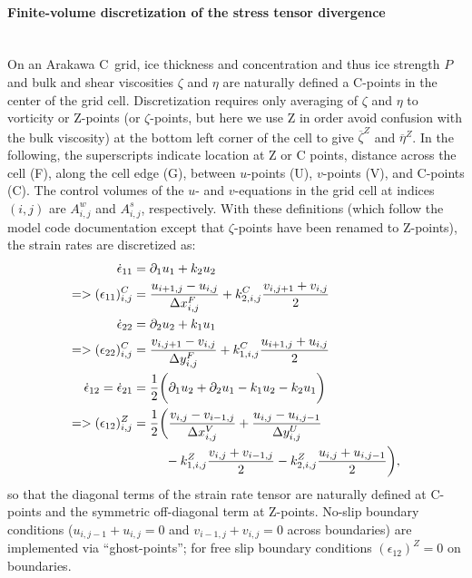 \paragraph{Finite-volume discretization of the stress tensor
  divergence\label{sec:pkg:seaice:discretization}}~\\
%
On an Arakawa C~grid, ice thickness and concentration and thus ice
strength $P$ and bulk and shear viscosities $\zeta$ and $\eta$ are
naturally defined a C-points in the center of the grid
cell. Discretization requires only averaging of $\zeta$ and $\eta$ to
vorticity or Z-points (or $\zeta$-points, but here we use Z in order
avoid confusion with the bulk viscosity) at the bottom left corner of
the cell to give $\overline{\zeta}^{Z}$ and $\overline{\eta}^{Z}$. In
the following, the superscripts indicate location at Z or C points,
distance across the cell (F), along the cell edge (G), between
$u$-points (U), $v$-points (V), and C-points (C). The control volumes
of the $u$- and $v$-equations in the grid cell at indices $(i,j)$ are
$A_{i,j}^{w}$ and $A_{i,j}^{s}$, respectively. With these definitions
(which follow the model code documentation except that $\zeta$-points
have been renamed to Z-points), the strain rates are discretized as:
\begin{align}
  \dot{\epsilon}_{11} &= \partial_{1}{u}_{1} + k_{2}u_{2} \\ \notag
  => (\epsilon_{11})_{i,j}^C &= \frac{u_{i+1,j}-u_{i,j}}{\Delta{x}_{i,j}^{F}} 
   + k_{2,i,j}^{C}\frac{v_{i,j+1}+v_{i,j}}{2} \\ 
  \dot{\epsilon}_{22} &= \partial_{2}{u}_{2} + k_{1}u_{1} \\\notag
  => (\epsilon_{22})_{i,j}^C &= \frac{v_{i,j+1}-v_{i,j}}{\Delta{y}_{i,j}^{F}} 
   + k_{1,i,j}^{C}\frac{u_{i+1,j}+u_{i,j}}{2} \\ 
   \dot{\epsilon}_{12} = \dot{\epsilon}_{21} &= \frac{1}{2}\biggl(
   \partial_{1}{u}_{2} + \partial_{2}{u}_{1} - k_{1}u_{2} - k_{2}u_{1}
   \biggr) \\ \notag
  => (\epsilon_{12})_{i,j}^Z &= \frac{1}{2}
  \biggl( \frac{v_{i,j}-v_{i-1,j}}{\Delta{x}_{i,j}^V} 
   + \frac{u_{i,j}-u_{i,j-1}}{\Delta{y}_{i,j}^U} \\\notag
  &\phantom{=\frac{1}{2}\biggl(}
   - k_{1,i,j}^{Z}\frac{v_{i,j}+v_{i-1,j}}{2}
   - k_{2,i,j}^{Z}\frac{u_{i,j}+u_{i,j-1}}{2}
   \biggr),
\end{align}
so that the diagonal terms of the strain rate tensor are naturally
defined at C-points and the symmetric off-diagonal term at
Z-points. No-slip boundary conditions ($u_{i,j-1}+u_{i,j}=0$ and
$v_{i-1,j}+v_{i,j}=0$ across boundaries) are implemented via
``ghost-points''; for free slip boundary conditions
$(\epsilon_{12})^Z=0$ on boundaries.

